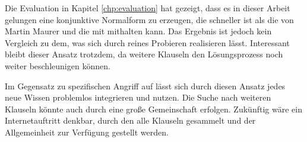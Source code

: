 Die Evaluation in Kapitel \ref{chp:evaluation} hat gezeigt, dass es in dieser Arbeit gelungen eine konjunktive Normalform zu erzeugen, die schneller
ist als die von Martin Maurer und die mit  mithalten kann. Das Ergebnis ist jedoch kein Vergleich zu dem, was sich durch reines Probieren
realisieren lässt. Interessant bleibt dieser Ansatz trotzdem, da weitere Klauseln den Lösungsprozess noch weiter beschleunigen können.

Im Gegensatz zu spezifischen Angriff auf  lässt sich durch diesen Ansatz jedes neue Wissen problemlos integrieren und nutzen.
Die Suche nach weiteren Klauseln könnte auch durch eine große Gemeinschaft erfolgen. Zukünftig wäre ein Internetauftritt denkbar, durch den
alle Klauseln gesammelt und der Allgemeinheit zur Verfügung gestellt werden.

